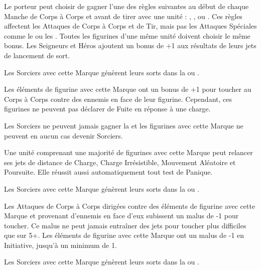 \markstartsidetext{\markofchange}
Le porteur peut choisir de gagner l'une des règles suivantes au début de chaque Manche de Corps à Corps et avant de tirer avec une unité : \divineattacks{}, \flamingattacks{}, \magicalattacks{} ou \hellfire{}. Ces règles affectent les Attaques de Corps à Corps et de Tir, mais pas les Attaques Spéciales comme le \stomp{} ou les \impacthits{}. Toutes les figurines d'une même unité doivent choisir le même bonus. Les Seigneurs et Héros ajoutent un bonus de +1 aux résultats de leurs jets de lancement de sort.

Les Sorciers avec cette Marque génèrent leurs sorts dans la \Pathof{} \alchemy{} ou \change{}.
\markclosesidetext{}\hfill{}

\spacebetweenmarks{}

\hfill\markstartsidetext{\markofwrath}
Les éléments de figurine avec cette Marque ont un bonus de +1 pour toucher au Corps à Corps contre des ennemis en face de leur figurine. Cependant, ces figurines ne peuvent pas déclarer de Fuite en réponse à une charge.

Les Sorciers ne peuvent jamais gagner la \markofwrath{} et les figurines avec cette Marque ne peuvent en aucun cas devenir Sorciers.
\markclosesidetext{}

\spacebetweenmarks{}

\markstartsidetext{\markoflust}
Une unité comprenant une majorité de figurines avec cette Marque peut relancer ses jets de distance de Charge, Charge Irrésistible, Mouvement Aléatoire et Poursuite. Elle réussit aussi automatiquement tout test de Panique.

Les Sorciers avec cette Marque génèrent leurs sorts dans la \Pathof{} \lust{} ou \shadows{}.
\markclosesidetext{}\hfill{}

\spacebetweenmarks{}

\hfill\markstartsidetext{\markofpestilence}
Les Attaques de Corps à Corps dirigées contre des éléments de figurine avec cette Marque et provenant d'ennemis en face d'eux subissent un malus de -1 pour toucher. Ce malus ne peut jamais entraîner des jets pour toucher plus difficiles que sur 5+. Les éléments de figurine avec cette Marque ont un malus de -1 en Initiative, jusqu'à un minimum de 1.

Les Sorciers avec cette Marque génèrent leurs sorts dans la \Pathof{} \disease{} ou \death{}.
\markclosesidetext{}

\spacebetweenmarks{}


